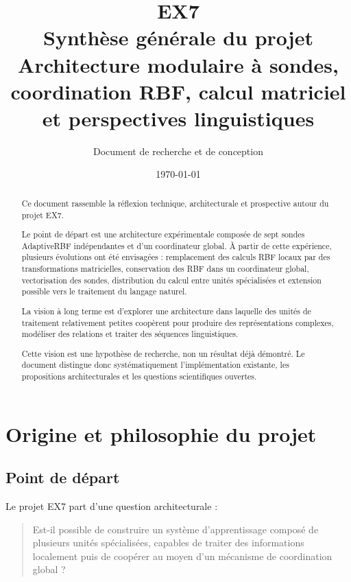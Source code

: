 \documentclass[11pt,a4paper]{report}
\title{
  \Huge\textbf{EX7}\\[0.3cm]
  \Large Synthèse générale du projet\\[0.2cm]
  \large Architecture modulaire à sondes, coordination RBF,
  calcul matriciel et perspectives linguistiques
}
\author{Document de recherche et de conception}
\date{\today}
\begin{document}
\maketitle

\begin{abstract}
Ce document rassemble la réflexion technique, architecturale
et prospective autour du projet EX7.

Le point de départ est une architecture expérimentale composée
de sept sondes AdaptiveRBF indépendantes et d'un coordinateur
global. À partir de cette expérience, plusieurs évolutions
ont été envisagées : remplacement des calculs RBF locaux par
des transformations matricielles, conservation des RBF dans
un coordinateur global, vectorisation des sondes, distribution
du calcul entre unités spécialisées et extension possible
vers le traitement du langage naturel.

La vision à long terme est d'explorer une architecture dans
laquelle des unités de traitement relativement petites
coopèrent pour produire des représentations complexes,
modéliser des relations et traiter des séquences linguistiques.

Cette vision est une hypothèse de recherche, non un résultat
déjà démontré. Le document distingue donc systématiquement
l'implémentation existante, les propositions architecturales
et les questions scientifiques ouvertes.
\end{abstract}

\tableofcontents
\listoffigures
\listoftables
\newpage

\chapter{Origine et philosophie du projet}

\section{Point de départ}

Le projet EX7 part d'une question architecturale :

\begin{quote}
Est-il possible de construire un système d'apprentissage
composé de plusieurs unités spécialisées, capables de traiter
des informations localement puis de coopérer au moyen d'un
mécanisme de coordination global ?
\end{quote}
\end{document}

